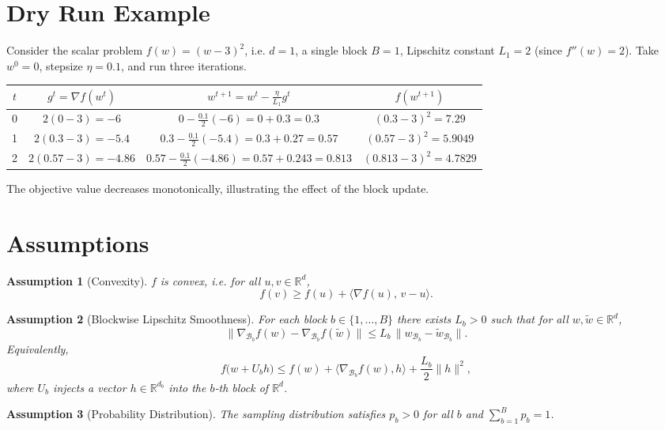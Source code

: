 \documentclass{article}
\newtheorem{assumption}{Assumption}
\newcommand{\R}{\mathbb{R}}
\begin{document}
\section*{Dry Run Example}
Consider the scalar problem $f(w)=(w-3)^{2}$, i.e. $d=1$, a single block $B=1$,
Lipschitz constant $L_{1}=2$ (since $f''(w)=2$).  
Take $w^{0}=0$, stepsize $\eta=0.1$, and run three iterations.

\begin{center}
\begin{tabular}{c|c|c|c}
$t$ & $g^{t}=\nabla f(w^{t})$ & $w^{t+1}=w^{t}-\frac{\eta}{L_{1}}g^{t}$ & $f(w^{t+1})$\\ \hline
0 & $2(0-3)=-6$ & $0-\frac{0.1}{2}(-6)=0+0.3=0.3$ & $(0.3-3)^{2}=7.29$\\
1 & $2(0.3-3)=-5.4$ & $0.3-\frac{0.1}{2}(-5.4)=0.3+0.27=0.57$ & $(0.57-3)^{2}=5.9049$\\
2 & $2(0.57-3)=-4.86$ & $0.57-\frac{0.1}{2}(-4.86)=0.57+0.243=0.813$ & $(0.813-3)^{2}=4.7829$
\end{tabular}
\end{center}
The objective value decreases monotonically, illustrating the effect of the block update.

\newpage
\section*{Assumptions}
\begin{assumption}[Convexity]\label{ass:convex}
$f$ is convex, i.e. for all $u,v\in\R^{d}$,
\[
f(v)\ge f(u)+\langle\nabla f(u),\,v-u\rangle .
\]
\end{assumption}

\begin{assumption}[Blockwise Lipschitz Smoothness]\label{ass:block-smooth}
For each block $b\in\{1,\dots ,B\}$ there exists $L_{b}>0$ such that for all $w,\tilde w\in\R^{d}$,
\[
\bigl\|\nabla_{\mathcal{B}_{b}}f(w)-\nabla_{\mathcal{B}_{b}}f(\tilde w)\bigr\|
\le L_{b}\,\bigl\|w_{\mathcal{B}_{b}}-\tilde w_{\mathcal{B}_{b}}\bigr\|.
\]
Equivalently,
\[
f\bigl(w+U_{b}h\bigr)\le
f(w)+\langle\nabla_{\mathcal{B}_{b}}f(w),h\rangle+\frac{L_{b}}{2}\|h\|^{2},
\tag{2}
\]
where $U_{b}$ injects a vector $h\in\R^{d_{b}}$ into the $b$‑th block of $\R^{d}$.
\end{assumption}

\begin{assumption}[Probability Distribution]\label{ass:prob}
The sampling distribution satisfies $p_{b}>0$ for all $b$ and $\sum_{b=1}^{B}p_{b}=1$.
\end{assumption}
\end{document}
